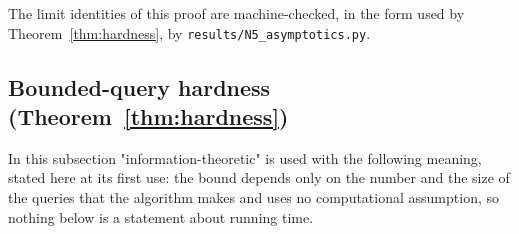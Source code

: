 The limit identities of this proof are machine-checked, in the form used by
Theorem~\ref{thm:hardness}, by \texttt{results/N5\_asymptotics.py}.

\subsection{Bounded-query hardness (Theorem~\ref{thm:hardness})}
\label{app:hardness}

In this subsection "information-theoretic" is used with the following meaning,
stated here at its first use: the bound depends only on the number and the
size of the queries that the algorithm makes and uses no computational
assumption, so nothing below is a statement about running time.

